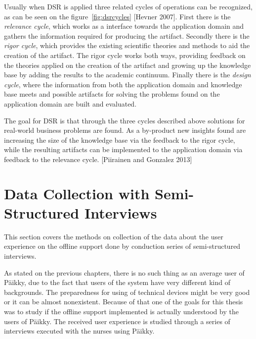 Usually when DSR is applied three related cycles of operations can be recognized, as can be seen on the figure~\ref{fig:dsrcycles} [Hevner 2007]. First there is the \textit{relevance cycle}, which works as a interface towards the application domain and gathers the information required for producing the artifact. Secondly there is the \textit{rigor cycle}, which provides the existing scientific theories and methods to aid the creation of the artifact. The rigor cycle works both ways, providing feedback on the theories applied on the creation of the artifact and growing up the knowledge base by adding the results to the academic continuum. Finally there is the \textit{design cycle}, where the information from both the application domain and knowledge base meets and possible artifacts for solving the problems found on the application domain are built and evaluated. 

The goal for DSR is that through the three cycles described above solutions for real-world business problems are found. As a by-product new insights found are increasing the size of the knowledge base via the feedback to the rigor cycle, while the resulting artifacts can be implemented to the application domain via feedback to the relevance cycle. [Piirainen and Gonzalez 2013]






\section{Data Collection with Semi-Structured Interviews}

This section covers the methods on collection of the data about the user experience on the offline support done by conduction series of semi-structured interviews.

As stated on the previous chapters, there is no such thing as an average user of Päikky, due to the fact that users of the system have very different kind of backgrounds. The preparedness for using of technical devices might be very good or it can be almost nonexistent. Because of that one of the goals for this thesis was to study if the offline support implemented is actually understood by the users of Päikky. The received user experience is studied through a series of interviews executed with the nurses using Päikky.

